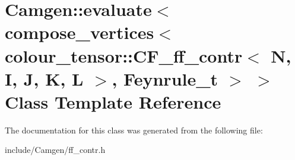 \hypertarget{a00159}{\section{Camgen\-:\-:evaluate$<$ compose\-\_\-vertices$<$ colour\-\_\-tensor\-:\-:C\-F\-\_\-ff\-\_\-contr$<$ N, I, J, K, L $>$, Feynrule\-\_\-t $>$ $>$ Class Template Reference}
\label{a00159}
}


The documentation for this class was generated from the following file\-:\begin{DoxyCompactItemize}
\item 
include/\-Camgen/ff\-\_\-contr.\-h\end{DoxyCompactItemize}

